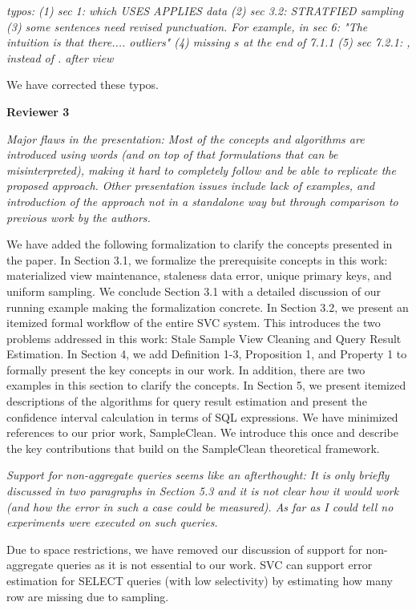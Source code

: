 \vspace{1em}
\emph{typos:
(1) sec 1: which USES APPLIES data
(2) sec 3.2: STRATFIED sampling
(3) some sentences need revised punctuation. For example, in sec 6: "The intuition is that there.... outliers"
(4) missing $s$ at the end of 7.1.1
(5) sec 7.2.1: , instead of . after view}

We have corrected these typos.

\vspace{1em}
\noindent\textbf{Reviewer 3}

\vspace{1em}
\emph{Major flaws in the presentation: Most of the concepts and algorithms are introduced using words (and on top of that formulations that can be misinterpreted), making it hard to completely follow and be able to replicate the proposed approach. Other presentation issues include lack of examples, and introduction of the approach not in a standalone way but through comparison to previous work by the authors.}

We have added the following formalization to clarify the concepts presented in the paper. In Section 3.1, we formalize the prerequisite concepts in this work: materialized view maintenance, staleness data error, unique primary keys, and uniform sampling. We conclude Section 3.1 with a detailed discussion of our running example making the formalization concrete. In Section 3.2, we present an itemized formal workflow of the entire SVC system. This introduces the two problems addressed in this work: Stale Sample View Cleaning and Query Result Estimation. In Section 4, we add Definition 1-3, Proposition 1, and Property 1 to formally present the key concepts in our work. In addition, there are two examples in this section to clarify the concepts. In Section 5, we present itemized descriptions of the algorithms for query result estimation and present the confidence interval calculation in terms of SQL expressions. We have minimized references to our prior work, SampleClean. We introduce this once and describe the key contributions that build on the SampleClean theoretical framework.

\vspace{1em}
\emph{Support for non-aggregate queries seems like an afterthought: It is only briefly discussed in two paragraphs in Section 5.3 and it is not clear how it would work (and how the error in such a case could be measured). As far as I could tell no experiments were executed on such queries.}

Due to space restrictions, we have removed our discussion of support for non-aggregate queries as it is not essential to our work. SVC can support error estimation for SELECT queries (with low selectivity) by estimating how many row are missing due to sampling.

